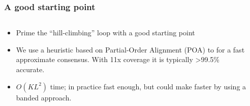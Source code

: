\documentclass[serif,11pt]{beamer}
\begin{document}
\begin{frame}
\frametitle{A good starting point}
\label{sec-2-10}
\begin{columns}
\begin{column}{0.6\textwidth}
\label{sec-2-10-1}

\begin{itemize}
\item Prime the ``hill-climbing'' loop with a good starting point
\item We use a heuristic based on Partial-Order Alignment (POA) to for
     a fast approximate consensus.  With 11x coverage it is typically
     >99.5\% accurate.
\item $O(KL^2)$ time; in practice fast enough, but could make faster by
     using a banded approach.
\end{itemize}
\end{column}
\begin{column}{0.4\textwidth}
\label{sec-2-10-2}


\end{column}
\end{columns}
\end{frame}
\end{document}
